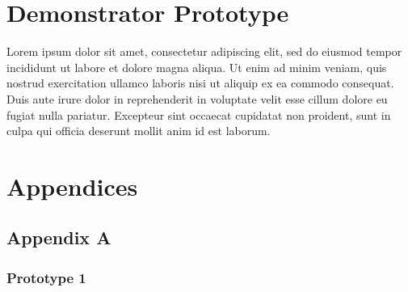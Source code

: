\documentclass[10pt,twocolumn]{article} %
\begin{document}
\section*{Demonstrator Prototype}

Lorem ipsum dolor sit amet, consectetur adipiscing elit, sed do eiusmod tempor incididunt ut labore et dolore magna aliqua. Ut enim ad minim veniam, quis nostrud exercitation ullamco laboris nisi ut aliquip ex ea commodo consequat. Duis aute irure dolor in reprehenderit in voluptate velit esse cillum dolore eu fugiat nulla pariatur. Excepteur sint occaecat cupidatat non proident, sunt in culpa qui officia deserunt mollit anim id est laborum.

\section*{Appendices}
\subsection*{Appendix A}
\subsubsection*{Prototype 1}
\end{document}
